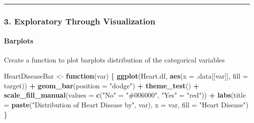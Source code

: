 \documentclass[
]{article}
\newenvironment{Shaded}{\begin{snugshade}}{\end{snugshade}}
\newcommand{\AttributeTok}[1]{\textcolor[rgb]{0.13,0.29,0.53}{#1}}
\newcommand{\CommentTok}[1]{\textcolor[rgb]{0.56,0.35,0.01}{\textit{#1}}}
\newcommand{\ControlFlowTok}[1]{\textcolor[rgb]{0.13,0.29,0.53}{\textbf{#1}}}
\newcommand{\FunctionTok}[1]{\textcolor[rgb]{0.13,0.29,0.53}{\textbf{#1}}}
\newcommand{\NormalTok}[1]{#1}
\newcommand{\OtherTok}[1]{\textcolor[rgb]{0.56,0.35,0.01}{#1}}
\newcommand{\SpecialCharTok}[1]{\textcolor[rgb]{0.81,0.36,0.00}{\textbf{#1}}}
\newcommand{\StringTok}[1]{\textcolor[rgb]{0.31,0.60,0.02}{#1}}
\begin{document}
\begin{Shaded}
\end{Shaded}

\begin{center}\rule{0.5\linewidth}{0.5pt}\end{center}

\subsubsection{\texorpdfstring{\textbf{3. Exploratory Through
Visualization}}{3. Exploratory Through Visualization}}\label{exploratory-through-visualization}

\paragraph{\texorpdfstring{\textbf{Barplots}}{Barplots}}\label{barplots}

Create a function to plot barplots distribution of the categorical
variables

\begin{Shaded}
\begin{Highlighting}[]
\NormalTok{HeartDiseaseBar }\OtherTok{\textless{}{-}} \ControlFlowTok{function}\NormalTok{(var) \{}
  \FunctionTok{ggplot}\NormalTok{(Heart.df, }\FunctionTok{aes}\NormalTok{(}\AttributeTok{x =}\NormalTok{ .data[[var]], }\AttributeTok{fill =}\NormalTok{ target)) }\SpecialCharTok{+}
    \FunctionTok{geom\_bar}\NormalTok{(}\AttributeTok{position =} \StringTok{"dodge"}\NormalTok{) }\SpecialCharTok{+} \FunctionTok{theme\_test}\NormalTok{() }\SpecialCharTok{+}
    \FunctionTok{scale\_fill\_manual}\NormalTok{(}\AttributeTok{values =} \FunctionTok{c}\NormalTok{(}\StringTok{"No"} \OtherTok{=} \StringTok{"\#006000"}\NormalTok{, }\StringTok{"Yes"} \OtherTok{=} \StringTok{"red"}\NormalTok{)) }\SpecialCharTok{+}
    \FunctionTok{labs}\NormalTok{(}\AttributeTok{title =} \FunctionTok{paste}\NormalTok{(}\StringTok{"Distribution of Heart Disease by"}\NormalTok{, var),}
         \AttributeTok{x =}\NormalTok{ var, }\AttributeTok{fill =} \StringTok{"Heart Disease"}\NormalTok{)}
\NormalTok{\}}
\end{Highlighting}
\end{Shaded}
\end{document}
